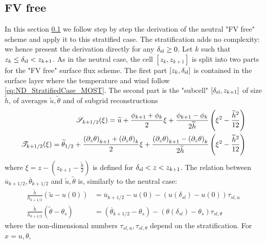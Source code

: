 \subsection{FV free}
\label{sec:ND_StratifiedCase_FVfree}
In this section \ref{sec:ND_StratifiedCase_FVfree} we follow
step by step the derivation of the neutral "FV free" scheme and
apply it to this stratified case. The stratification adds no
complexity: we hence present the derivation directly for
any $\delta_{\rm sl} \geq 0$.
Let $k$ such that $z_k \leq \delta_{\rm sl} < z_{k+1}$.
As in the neutral case, the cell $[z_k, z_{k+1}]$ is split
into two parts for the "FV free" surface flux scheme.
The first part $[z_k,\delta_{\rm sl}]$ is contained
in the surface layer where the temperature and wind
follow \eqref{eq:ND_StratifiedCase_MOST}.
The second part is the
"subcell" $[\delta_{\rm sl}, z_{k+1}]$ of size $\widetilde{h}$, of
averages $\widetilde{u}, \widetilde{\theta}$
and of subgrid reconstructions
\begin{equation}
\begin{aligned}
{\cal S}_{k+1/2}(\xi) = \widetilde{u} +
	\frac{\phi_{k+1} + \phi_{k}}{2} \xi
+ \frac{\phi_{k+1} - \phi_{k}}{2\widetilde{h}}
	\left(\xi^2 - \frac{\widetilde{h}^2}{12}\right) \\
{\cal T}_{k+1/2}(\xi) = \widetilde{\theta}_{1/2} +
	\frac{{(\partial_z \theta)}_{k+1} + 
		{(\partial_z \theta)}_{k}}{2} \xi
+ \frac{{(\partial_z \theta)}_{k+1} - {(\partial_z \theta)}_{k}}
	{2\widetilde{h}}
	\left(\xi^2 - \frac{\widetilde{h}^2}{12}\right)
\end{aligned}
\end{equation}
where $\xi = z - (z_{k+1} - \frac{\widetilde{h}}{2})$ is defined
for $\delta_{\rm sl} < z < z_{k+1}$.
The relation between
$\overline{u}_{k+1/2}, \overline{\theta}_{k+1/2}$ and
$\widetilde{u},\widetilde{\theta}$ is, similarly to the neutral case:
\begin{equation} \label{eq:ND_StratifiedCase_tmprelation_tilde_bar}
\begin{aligned}
	\frac{\widetilde{h}}{h_{k+1/2}} (\widetilde{u}-u(0)) &=
	\overline{u}_{k+1/2}-u(0) - 
	(u(\delta_{sl})-u(0)) \tau_{sl, u}\\
	\frac{\widetilde{h}}{h_{k+1/2}}
	(\widetilde{\theta} - \theta_s) &=
	(\overline{\theta}_{k+1/2}-\theta_s) -
	(\theta(\delta_{sl})-\theta_s)\tau_{sl, \theta}
\end{aligned}
\end{equation}
where the non-dimensional numbers $\tau_{sl, u}, \tau_{sl, \theta}$
depend on the stratification. For $x=u, \theta$,
